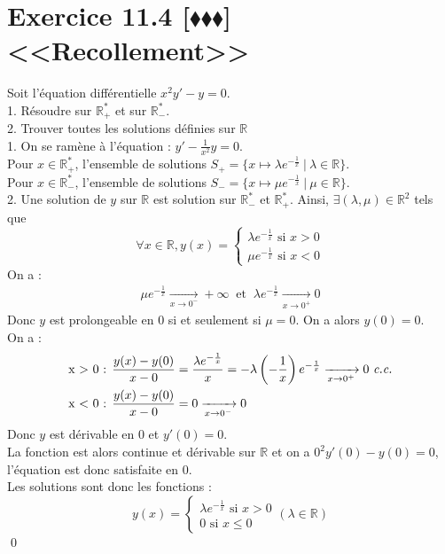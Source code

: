 \documentclass[10pt]{article}
\begin{document}
\section*{Exercice 11.4 [$\blacklozenge\blacklozenge\blacklozenge$] <<Recollement>>}
\begin{tcolorbox}[enhanced, width=7in, center, size=fbox, fontupper=\large, drop shadow southwest]
    Soit l'équation différentielle $x^2y' - y = 0$.\\
    1. Résoudre sur $\mathbb{R}^*_+$ et sur $\mathbb{R}^*_-$.\\
    2. Trouver toutes les solutions définies sur $\mathbb{R}$\\[0.1cm]
    1. On se ramène à l'équation : $y' - \frac{1}{x^2}y = 0$.\\
    Pour $x\in\mathbb{R}^*_+$, l'ensemble de solutions $S_+ = \{x\mapsto \lambda e^{-\frac{1}{x}} ~ | ~ \lambda \in \mathbb{R}\}$.\\
    Pour $x\in\mathbb{R}^*_-$, l'ensemble de solutions $S_- = \{x\mapsto \mu e^{-\frac{1}{x}} ~ | ~ \mu \in \mathbb{R}\}$.\\
    2. Une solution de $y$ sur $\mathbb{R}$ est solution sur $\mathbb{R}^*_-$ et $\mathbb{R}^*_+$. Ainsi, $\exists(\lambda, \mu)\in\mathbb{R}^2$ tels que
    \begin{equation*}
        \forall{x\in\mathbb{R}}, y(x) = \begin{cases} \lambda e^{-\frac{1}{x}} \text{ si } x>0\\ \mu e^{-\frac{1}{x}} \text{ si } x<0\end{cases}
    \end{equation*}
    On a :
    \begin{align*}
        \mu e^{-\frac{1}{x}} \xrightarrow[x\to0^-]{}+\infty ~ \text{ et } ~ \lambda e^{-\frac{1}{x}} \xrightarrow[x\to0^+]{} 0
    \end{align*}
    Donc $y$ est prolongeable en $0$ si et seulement si $\mu=0$. On a alors $y(0)=0$.\\
    On a :
    \begin{align*}
        &\text {x > 0 : } \frac{y(x) - y(0)}{x - 0} = \frac{\lambda e^{-\frac{1}{x}}}{x}=-\lambda\left(-\frac{1}{x}\right)e^{-\frac{1}{x}} \xrightarrow[x\to0^+]{}0 ~ \text{\emph{c.c.}}\\
        &\text {x < 0 : } \frac{y(x) - y(0)}{x - 0} = 0 \xrightarrow[x\to0^-]{} 0
    \end{align*}
    Donc $y$ est dérivable en $0$ et $y'(0)=0$.\\
    La fonction est alors continue et dérivable sur $\mathbb{R}$ et on a $0^2y'(0)-y(0)=0$, l'équation est donc satisfaite en $0$.\\
    Les solutions sont donc les fonctions : 
    \begin{equation*}
        y(x) = \begin{cases}
            \lambda e^{-\frac{1}{x}} \text{ si } x>0\\
            0 \text{ si } x\leq0
        \end{cases}
        (\lambda \in \mathbb{R})
    \end{equation*}
    \qed
\end{tcolorbox}

\end{document}
